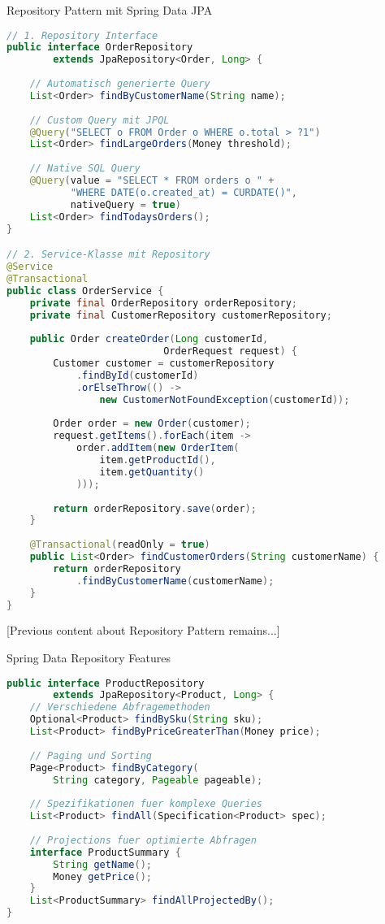 \begin{KR}{Repository Pattern mit Spring Data JPA}
\begin{lstlisting}[language=Java]
// 1. Repository Interface
public interface OrderRepository 
        extends JpaRepository<Order, Long> {
    
    // Automatisch generierte Query
    List<Order> findByCustomerName(String name);
    
    // Custom Query mit JPQL
    @Query("SELECT o FROM Order o WHERE o.total > ?1")
    List<Order> findLargeOrders(Money threshold);
    
    // Native SQL Query
    @Query(value = "SELECT * FROM orders o " +
           "WHERE DATE(o.created_at) = CURDATE()", 
           nativeQuery = true)
    List<Order> findTodaysOrders();
}

// 2. Service-Klasse mit Repository
@Service
@Transactional
public class OrderService {
    private final OrderRepository orderRepository;
    private final CustomerRepository customerRepository;
    
    public Order createOrder(Long customerId, 
                           OrderRequest request) {
        Customer customer = customerRepository
            .findById(customerId)
            .orElseThrow(() -> 
                new CustomerNotFoundException(customerId));
            
        Order order = new Order(customer);
        request.getItems().forEach(item -> 
            order.addItem(new OrderItem(
                item.getProductId(),
                item.getQuantity()
            )));
            
        return orderRepository.save(order);
    }
    
    @Transactional(readOnly = true)
    public List<Order> findCustomerOrders(String customerName) {
        return orderRepository
            .findByCustomerName(customerName);
    }
}
\end{lstlisting}
\end{KR}

[Previous content about Repository Pattern remains...]

\begin{example}{Spring Data Repository Features}
\begin{lstlisting}[language=Java]
public interface ProductRepository 
        extends JpaRepository<Product, Long> {
    // Verschiedene Abfragemethoden
    Optional<Product> findBySku(String sku);
    List<Product> findByPriceGreaterThan(Money price);
    
    // Paging und Sorting
    Page<Product> findByCategory(
        String category, Pageable pageable);
    
    // Spezifikationen fuer komplexe Queries
    List<Product> findAll(Specification<Product> spec);
    
    // Projections fuer optimierte Abfragen
    interface ProductSummary {
        String getName();
        Money getPrice();
    }
    List<ProductSummary> findAllProjectedBy();
}
\end{lstlisting}
\end{example}